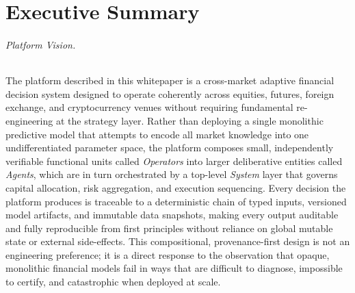\documentclass[12pt,openany]{book}
\numberwithin{equation}{chapter}
\theoremstyle{plain}
\theoremstyle{definition}
\theoremstyle{remark}
\begin{document}
\chapter*{Executive Summary}

\subparagraph{Platform Vision.}
The platform described in this whitepaper is a cross-market adaptive financial
decision system designed to operate coherently across equities, futures,
foreign exchange, and cryptocurrency venues without requiring fundamental
re-engineering at the strategy layer. Rather than deploying a single
monolithic predictive model that attempts to encode all market knowledge into
one undifferentiated parameter space, the platform composes small,
independently verifiable functional units called \emph{Operators} into larger
deliberative entities called \emph{Agents}, which are in turn orchestrated by
a top-level \emph{System} layer that governs capital allocation, risk
aggregation, and execution sequencing. Every decision the platform produces is
traceable to a deterministic chain of typed inputs, versioned model artifacts,
and immutable data snapshots, making every output auditable and fully
reproducible from first principles without reliance on global mutable state or
external side-effects. This compositional, provenance-first design is not an
engineering preference; it is a direct response to the observation that opaque,
monolithic financial models fail in ways that are difficult to diagnose,
impossible to certify, and catastrophic when deployed at scale.
\end{document}
